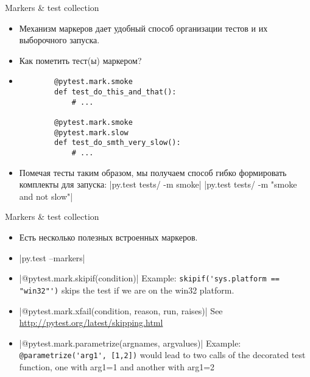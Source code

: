 \documentclass{beamer}
\begin{document}
\begin{frame}[fragile]{Markers \& test collection}
    \begin{itemize}
    \item Механизм маркеров дает удобный способ организации тестов и их выборочного запуска.
    \pause \item Как пометить тест(ы) маркером?
    \pause \item 
        \begin{verbatim}
        @pytest.mark.smoke
        def test_do_this_and_that():
            # ...

        @pytest.mark.smoke
        @pytest.mark.slow
        def test_do_smth_very_slow():
            # ...
        \end{verbatim}
    \pause \item Помечая тесты таким образом, мы получаем способ гибко формировать комплекты для запуска:
        |py.test tests/ -m smoke|
        |py.test tests/ -m "smoke and not slow"|
    \end{itemize}
\end{frame}

\begin{frame}[fragile]{Markers \& test collection}
    \begin{itemize}
    \item Есть несколько полезных встроенных маркеров.
    \pause \item {}|py.test --markers|
    \pause \item {}|@pytest.mark.skipif(condition)|
        Example: \verb|skipif('sys.platform == "win32"')| skips the test if we are on the win32 platform.
    \pause \item {}|@pytest.mark.xfail(condition, reason, run, raises)|
        See \url{http://pytest.org/latest/skipping.html}
    \pause \item {}|@pytest.mark.parametrize(argnames, argvalues)|
        Example: \verb|@parametrize('arg1', [1,2])| would lead to two calls of the decorated test function, one with arg1=1 and another with arg1=2
    \end{itemize}
\end{frame}
\end{document}
